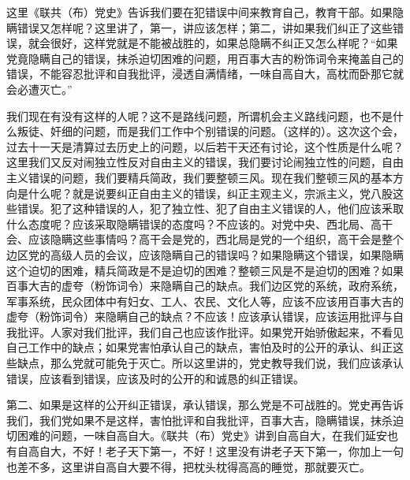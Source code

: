 这里《联共（布）党史》告诉我们要在犯错误中间来教育自己，教育干部。如果隐瞒错误又怎样呢？这里讲了，第一，讲应该怎样；第二，讲如果我们纠正了这些错误，就会很好，这样党就是不能被战胜的，如果总隐瞒不纠正又怎么样呢？“如果党竟隐瞒自己的错误，抹杀迫切困难的问题，用百事大吉的粉饰词令来掩盖自己的错误，不能容忍批评和自我批评，浸透自满情绪，一味自高自大，高枕而卧那它就会必遭灭亡。”

我们现在有没有这样的人呢？这不是路线问题，所谓机会主义路线问题，也不是什么叛徒、奸细的问题，而是我们工作中个别错误的问题。（这样的）。这次这个会，过去十一天是清算过去历史上的问题，以后若干天还有讨论，这个性质是什么呢？这里我们又反对闹独立性反对自由主义的错误，我们要讨论闹独立性的问题，自由主义错误的问题，我们要精兵简政，我们要整顿三风。现在我们整顿三风的基本方向是什么呢？就是说要纠正自由主义的错误，纠正主观主义，宗派主义，党八股这些错误。犯了这种错误的人，犯了独立性、犯了自由主义错误的人，他们应该釆取什么态度呢？应该采取隐瞒错误的态度吗？不应该的。对党中央、西北局、高干会、应该隐瞒这些事情吗？高干会是党的，西北局是党的一个组织，高干会是整个边区党的高级人员的会议，应该隐瞒自己的错误吗？如果隐瞒这个错误，如果隐瞒这个迫切的困难，精兵简政是不是迫切的困难？整顿三风是不是迫切的困难？如果百事大吉的虚夸（粉饰词令）来隐瞒自己的缺点。我们边区党的系统，政府系统，军事系统，民众团体中有妇女、工人、农民、文化人等，应该不应该用百事大吉的虚夸（粉饰词令）来隐瞒自己的缺点？不应该！应该承认错误，应该运用批评与自我批评。人家对我们批评，我们自己也应该作批评。如果党开始骄傲起来，不看见自己工作中的缺点；如果党害怕承认自己的缺点，害怕及时的公开的承认、纠正这些缺点，那么党就可能免于灭亡。所以这里讲的，党史教导我们说，我们应该承认错误，应该看到错误，应该及时的公开的和诚恳的纠正错误。

第二、如果是这样的公开纠正错误，承认错误，那么党是不可战胜的。党史再告诉我们，我们党如果不是这样，害怕批评和自我批评，百事大吉，隐瞒错误，抹杀迫切困难的问题，一味自高自大。《联共（布）党史》讲到自高自大，在我们延安也有自高自大，不好！老子天下第一，不好！这里没有讲老子天下第一，你加上一句也差不多，这里讲自高自大要不得，把枕头枕得高高的睡觉，那就要灭亡。

